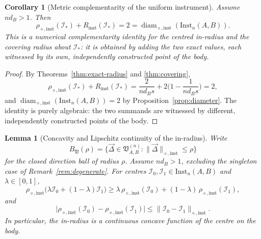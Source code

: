 \documentclass[11pt,a4paper]{article}
\newtheorem{lemma}[theorem]{Lemma}
\newtheorem{corollary}[theorem]{Corollary}
\newcommand{\Inst}{\mathrm{Inst}}
\newcommand{\diam}{\operatorname{diam}}
\newcommand{\vD}{\vec{\Delta}}
\begin{document}
\begin{corollary}[Metric complementarity of the uniform instrument]
\label{cor:complementarity}
Assume $nd_B>1$. Then
\[
\rho_{\diamond,\mathrm{inst}}(\mathcal I_*)+R_{\mathrm{inst}}(\mathcal I_*)
=2=\diam_{\diamond,\mathrm{inst}}(\Inst_n(A,B)).
\]
This is a numerical complementarity identity for the centred in-radius and the covering radius about $\mathcal I_*$: it is obtained by adding the two exact values, each witnessed by its own, independently constructed point of the body.
\end{corollary}

\begin{proof}
By Theorems~\ref{thm:exact-radius} and \ref{thm:covering},
\[
\rho_{\diamond,\mathrm{inst}}(\mathcal I_*)+R_{\mathrm{inst}}(\mathcal I_*)
=\frac{2}{nd_Bs}+2\Big(1-\frac1{nd_Bs}\Big)=2,
\]
and $\diam_{\diamond,\mathrm{inst}}(\Inst_n(A,B))=2$ by Proposition~\ref{prop:diameter}. The identity is purely algebraic: the two summands are witnessed by different, independently constructed points of the body.
\end{proof}

\begin{lemma}[Concavity and Lipschitz continuity of the in-radius]
\label{lem:inradius-concave}
Write
\[
B_{\mathfrak V}(\rho)=\big\{\vD\in\mathfrak V_{A,B}^{(n)}:\|\vD\|_{\diamond,\mathrm{inst}}\le\rho\big\}
\]
for the closed direction ball of radius $\rho$. Assume $nd_B>1$, excluding the singleton case of Remark~\ref{rem:degenerate}. For centres $\mathcal I_0,\mathcal I_1\in\Inst_n(A,B)$ and $\lambda\in[0,1]$,
\[
\rho_{\diamond,\mathrm{inst}}\big(\lambda\mathcal I_0+(1-\lambda)\mathcal I_1\big)
\ge\lambda\,\rho_{\diamond,\mathrm{inst}}(\mathcal I_0)+(1-\lambda)\,\rho_{\diamond,\mathrm{inst}}(\mathcal I_1),
\]
and
\[
\big|\rho_{\diamond,\mathrm{inst}}(\mathcal I_0)-\rho_{\diamond,\mathrm{inst}}(\mathcal I_1)\big|
\le\|\mathcal I_0-\mathcal I_1\|_{\diamond,\mathrm{inst}}.
\]
In particular, the in-radius is a continuous concave function of the centre on the body.
\end{lemma}
\end{document}
